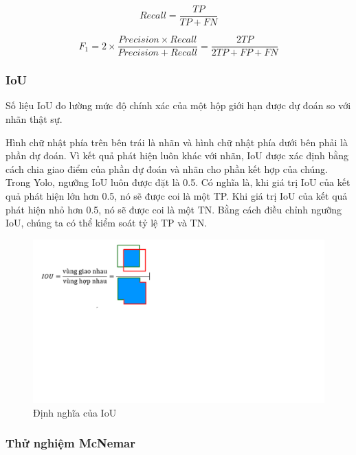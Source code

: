 \documentclass[../the.tex]{subfiles}
\begin{document}
\begin{equation}
	Recall = \frac{TP}{TP + FN}
	\label{eq:recall}
\end{equation}

\begin{equation}
	F_1 = 2 \times \frac{Precision \times Recall}{Precision + Recall} = \frac{2TP}{2TP + FP + FN}
	\label{eq:f1}
\end{equation}

\subsubsection*{IoU}

{\fontsize{13}{12} \selectfont
	Số liệu IoU đo lường mức độ chính xác của một hộp giới hạn được dự đoán so với nhãn thật sự.

	Hình chữ nhật phía trên bên trái là nhãn và hình chữ nhật phía dưới bên phải là phần dự đoán. Vì kết quả phát hiện luôn khác với nhãn, IoU được xác định bằng cách chia giao điểm của phần dự đoán và nhãn cho phần kết hợp của chúng. Trong Yolo, ngưỡng IoU luôn được đặt là 0.5. Có nghĩa là, khi giá trị IoU của kết quả phát hiện lớn hơn 0.5, nó sẽ được coi là một TP. Khi giá trị IoU của kết quả phát hiện nhỏ hơn 0.5, nó sẽ được coi là một TN. Bằng cách điều chỉnh ngưỡng IoU, chúng ta có thể kiểm soát tỷ lệ TP và TN.
}

\begin{figure}[ht!]
	\centering
	\includegraphics[width=1\textwidth]{images/IoU.PNG}
	\caption{Định nghĩa của IoU}
	\label{fig:IoU}
\end{figure}

\subsubsection*{Thử nghiệm McNemar}
\end{document}
